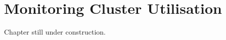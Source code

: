\chapter{Monitoring Cluster Utilisation}
\label{ch:monitoring-cluster-utilization}

Chapter still under construction.

